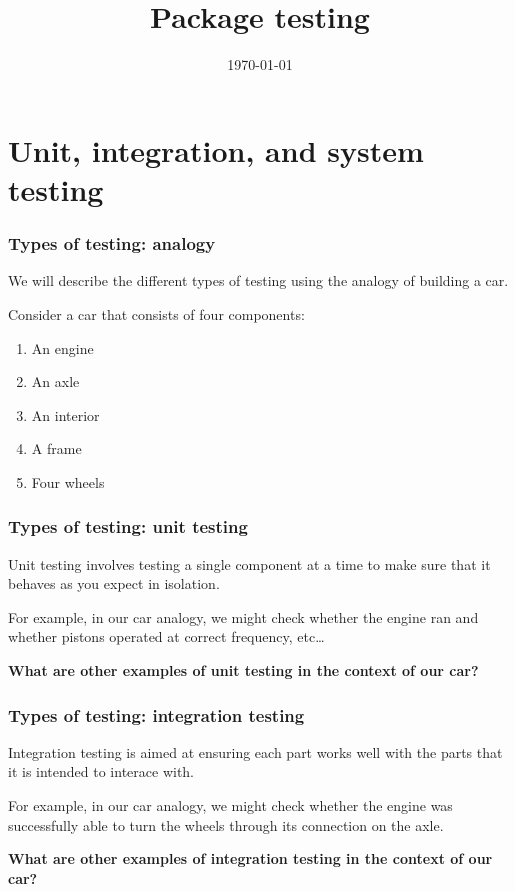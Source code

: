 \documentclass[10pt]{beamer}
\title{Package testing}
\date[]{\today}
\begin{document}
\begin{frame}
  \titlepage
\end{frame}


\section{Unit, integration, and system testing}

  \begin{frame} \frametitle{Types of testing: analogy}

    We will describe the different types of testing using the analogy of building a car.

    \vspace{0.25cm}

    Consider a car that consists of four components:

    \begin{enumerate}
      \item An engine
      \item An axle
      \item An interior
      \item A frame
      \item Four wheels
    \end{enumerate}

  \end{frame}

  \begin{frame} \frametitle{Types of testing: unit testing}

    Unit testing involves testing a single component at a time to make sure that it
    behaves as you expect in isolation.

    \vspace{0.25cm}

    For example, in our car analogy, we might check whether the engine ran and whether
    pistons operated at correct frequency, etc\dots

    \vspace{0.25cm}

    \textbf{What are other examples of unit testing in the context of our car?}

  \end{frame}

  \begin{frame} \frametitle{Types of testing: integration testing}

    Integration testing is aimed at ensuring each part works well with the parts that
    it is intended to interace with.

    \vspace{0.25cm}

    For example, in our car analogy, we might check whether the engine was successfully
    able to turn the wheels through its connection on the axle.

    \vspace{0.25cm}

    \textbf{What are other examples of integration testing in the context of our car?}

  \end{frame}
\end{document}

